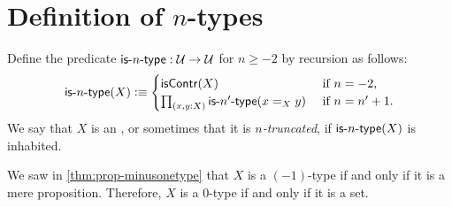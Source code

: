 \documentclass[hott-all.tex]{subfiles}
\begin{document}
\section{Definition of \texorpdfstring{$n$}{n}-types}
% 
% 
\begin{defn}
  Define the predicate $\mathsf{is}\mbox{-}{n}\mbox{-}\mathsf{type} : \mathcal{U} \to \mathcal{U}$ for $n \geq -2$ by recursion as follows:
  \[ \istype{n}(X) \defeq
  \begin{cases}
    \iscontr(X) & \text{ if } n = -2, \\
    \prd{x,y : X} \istype{n'}(\id[X]{x}{y}) & \text{ if } n = n'+1.
  \end{cases}
  \]
  We say that $X$ is an , or sometimes that it is \emph{$n$-truncated},
 if $\mathsf{is}\mbox{-}{n}\mbox{-}\mathsf{type}(X)$ is inhabited.
\end{defn}
% 
% 
\begin{eg}
  We saw in \cref{thm:prop-minusonetype} that $X$ is a $(-1)$-type if and only if it is a mere proposition.
  Therefore, $X$ is a $0$-type if and only if it is a set.
\end{eg}
% 
\end{document}
